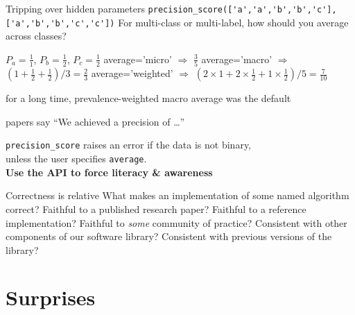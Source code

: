 \documentclass[aspectratio=169, 22pt]{beamer}
\newcommand{\hl}{\textcolor{usydred}}
\begin{document}
\begin{points}{Tripping over hidden parameters}
	\p 
\verb|precision_score(['a','a','b','b','c'], ['a','b','b','c','c'])|
	\p For multi-class or multi-label, how should you average across classes?
	\begin{itemize}
\p $P_a = \frac{1}{1}$, $P_b = \frac{1}{2}$, $P_c = \frac{1}{2}$
\p average='micro' $\Rightarrow$ $\frac{3}{5}$
\p average='macro' $\Rightarrow$ $(1 + \frac{1}{2} + \frac{1}{2}) / 3 = \frac{2}{3}$
\p average='weighted' $\Rightarrow$ $(2\times1 + 2\times\frac{1}{2} + 1\times\frac{1}{2}) / 5 = \frac{7}{10}$
	\end{itemize}
	\p for a long time, prevalence-weighted macro average was the default
	\begin{itemize}
	\p[$\therefore$] papers say ``We achieved a precision of \dots''
	\end{itemize}
	\pause
\p[Solution] \verb|precision_score| raises an error if the data is not binary,\\
unless the user specifies \verb|average|. \\ \hfill \textbf{\hl{Use the API to force literacy \& awareness}}
\end{points}

\begin{points}{Correctness is relative}
	\p What makes an implementation of some named algorithm \hl{correct}?
	\vfill
	\p Faithful to a published research paper?
	\p Faithful to a reference implementation?
	\p Faithful to \emph{some} community of practice?
	\p Consistent with other components of our software library?
	\p Consistent with previous versions of the library?
\end{points}

\section{Surprises}
\end{document}
